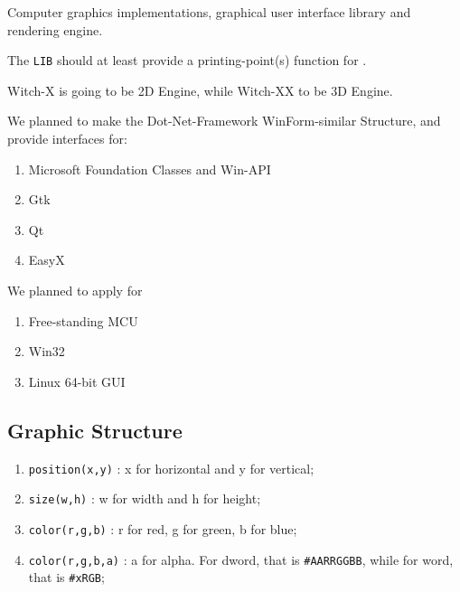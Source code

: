 
Computer graphics implementations, graphical user interface library and rendering engine.

The \verb`LIB` should at least provide a printing-point(s) function for .

Witch-X is going to be 2D Engine, while Witch-XX to be 3D Engine.

We planned to make the Dot-Net-Framework WinForm-similar Structure, and provide interfaces for:

\begin{enumerate}
	\item Microsoft Foundation Classes and Win-API
	\item Gtk
	\item Qt
	\item EasyX
\end{enumerate}

We planned to apply for

\begin{enumerate}
	\item Free-standing MCU
	\item Win32
	\item Linux 64-bit GUI
\end{enumerate}



\subsection{Graphic Structure}

\begin{enumerate}
	\item \verb`position(x,y)`  : x for horizontal and y for vertical;
	\item \verb`size(w,h)`      : w for width and h for height;
	\item \verb`color(r,g,b)`   : r for red, g for green, b for blue;
	\item \verb`color(r,g,b,a)` : a for alpha. For dword, that is \verb`#AARRGGBB`, while for word, that is \verb|#xRGB|;	
\end{enumerate}

